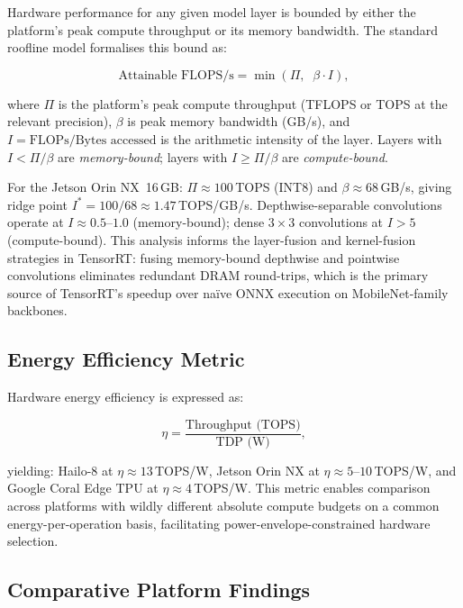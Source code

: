\documentclass[11pt,a4paper]{article}
\begin{document}
Hardware performance for any given model layer is bounded by either
the platform's peak compute throughput or its memory bandwidth.
The standard roofline model formalises this bound as:

\begin{equation}
  \text{Attainable FLOPS/s} = \min\!\left(
    \Pi,\;\; \beta \cdot I
  \right),
  \label{eq:roofline}
\end{equation}

\noindent where $\Pi$ is the platform's peak compute throughput
(TFLOPS or TOPS at the relevant precision), $\beta$ is peak memory
bandwidth (GB/s), and $I = \text{FLOPs}/\text{Bytes accessed}$ is
the arithmetic intensity of the layer. Layers with $I < \Pi/\beta$
are \emph{memory-bound}; layers with $I \geq \Pi/\beta$ are
\emph{compute-bound}.

For the Jetson Orin NX~16\,GB: $\Pi \approx 100$\,TOPS (INT8) and
$\beta \approx 68$\,GB/s, giving ridge point
$I^* = 100/68 \approx 1.47$\,TOPS/GB/s. Depthwise-separable
convolutions operate at $I \approx 0.5$--$1.0$ (memory-bound);
dense $3{\times}3$ convolutions at $I > 5$ (compute-bound).
This analysis informs the layer-fusion and kernel-fusion strategies
in TensorRT: fusing memory-bound depthwise and pointwise convolutions
eliminates redundant DRAM round-trips, which is the primary source of
TensorRT's speedup over na\"{i}ve ONNX execution on
MobileNet-family backbones.

\subsection{Energy Efficiency Metric}
\label{subsec:eta}

Hardware energy efficiency is expressed as:

\begin{equation}
  \eta = \frac{\text{Throughput (TOPS)}}{\text{TDP (W)}},
  \label{eq:efficiency}
\end{equation}

\noindent yielding: Hailo-8 at $\eta \approx 13$\,TOPS/W,
Jetson Orin NX at $\eta \approx 5$--$10$\,TOPS/W, and
Google Coral Edge TPU at $\eta \approx 4$\,TOPS/W. This metric
enables comparison across platforms with wildly different absolute
compute budgets on a common energy-per-operation basis, facilitating
power-envelope-constrained hardware selection.

\subsection{Comparative Platform Findings}
\end{document}
